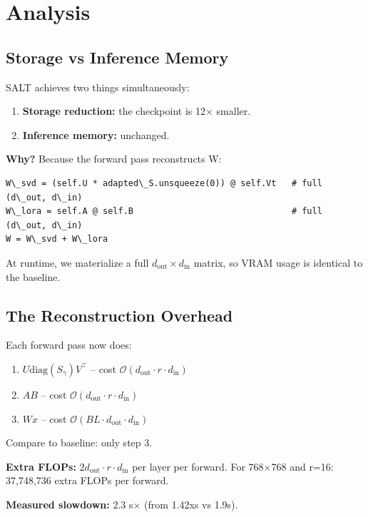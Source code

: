 
\section{Analysis}

\subsection{Storage vs Inference Memory}

SALT achieves two things simultaneously:

\begin{enumerate}
\item \textbf{Storage reduction:} the checkpoint is 12$\times$ smaller.
\item \textbf{Inference memory:} unchanged.

\end{enumerate}
\textbf{Why?} Because the forward pass reconstructs W:

\begin{lstlisting}
W\_svd = (self.U * adapted\_S.unsqueeze(0)) @ self.Vt   # full (d\_out, d\_in)
W\_lora = self.A @ self.B                               # full (d\_out, d\_in)
W = W\_svd + W\_lora
\end{lstlisting}

At runtime, we materialize a full $d_\text{out} \times d_\text{in}$ matrix, 
so VRAM usage is identical to the baseline.

\subsection{The Reconstruction Overhead}

Each forward pass now does:

\begin{enumerate}
\item $U \text{diag}(S_\gamma) V^\top$ -- cost $\mathcal{O}(d_\text{out} \cdot r \cdot d_\text{in})$
\item $A B$ -- cost $\mathcal{O}(d_\text{out} \cdot r \cdot d_\text{in})$
\item $W x$ -- cost $\mathcal{O}(BL \cdot d_\text{out} \cdot d_\text{in})$

\end{enumerate}
Compare to baseline: only step 3.

\textbf{Extra FLOPs:} $2 d_\text{out} \cdot r \cdot d_\text{in}$ per layer per 
forward. For 768$\times$768 and r=16: 37,748,736 extra FLOPs per forward.

\textbf{Measured slowdown:} 2.3 s$\times$ (from 1.42xs vs 1.9s).

